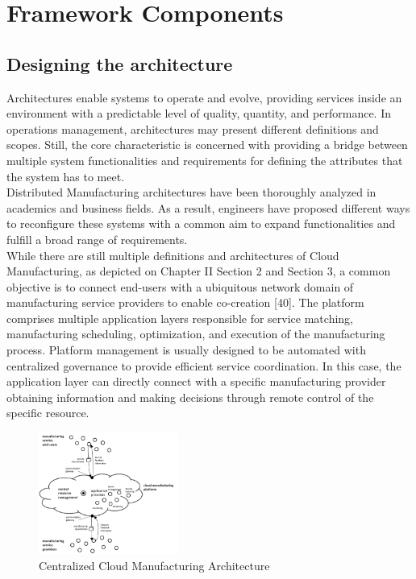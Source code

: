 \section{Framework Components}
\subsection{Designing the architecture}
Architectures enable systems to operate and evolve, providing services inside an environment with a predictable level of quality, quantity, and performance. In operations management, architectures may present different definitions and scopes. Still, the core characteristic is concerned with providing a bridge between multiple system functionalities and requirements for defining the attributes that the system has to meet.\\
Distributed Manufacturing architectures have been thoroughly analyzed in academics and business fields. As a result, engineers have proposed different ways to reconfigure these systems with a common aim to expand functionalities and fulfill a broad range of requirements.\\
While there are still multiple definitions and architectures of Cloud Manufacturing, as depicted on Chapter II Section 2 and Section 3, a common objective is to connect end-users with a ubiquitous network domain of manufacturing service providers to enable co-creation [40]. The platform comprises multiple application layers responsible for service matching, manufacturing scheduling, optimization, and execution of the manufacturing process. Platform management is usually designed to be automated with centralized governance to provide efficient service coordination. In this case, the application layer can directly connect with a specific manufacturing provider obtaining information and making decisions through remote control of the specific resource.
\begin{figure}
    \centering
    \includegraphics[height=4cm, keepaspectratio]{images/centralized-cmfg-architecture}
    \caption{Centralized Cloud Manufacturing Architecture}
    \label{fig:centralized-cmfg-architecture}
\end{figure}

